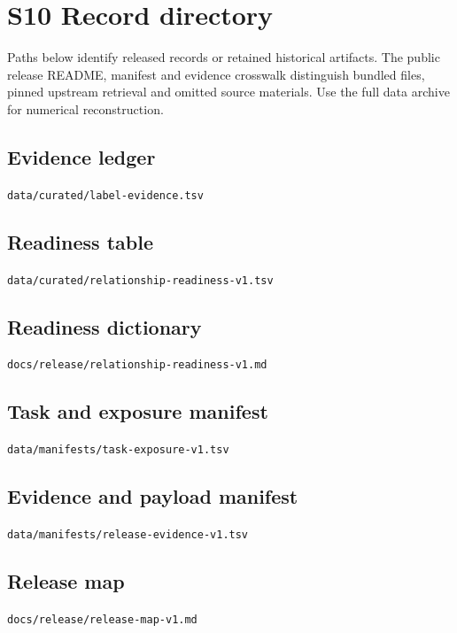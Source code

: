 \documentclass[
  10pt,
  a4paper,
]{article}
\begin{document}
\section{S10 Record directory}\label{s10-record-directory}

Paths below identify released records or retained historical artifacts. The public release README, manifest and evidence crosswalk distinguish bundled files, pinned upstream retrieval and omitted source materials. Use the full data archive for numerical reconstruction.

\subsection{Evidence ledger}\label{evidence-ledger}

\nolinkurl{data/curated/label-evidence.tsv}

\subsection{Readiness table}\label{readiness-table}

\nolinkurl{data/curated/relationship-readiness-v1.tsv}

\subsection{Readiness dictionary}\label{readiness-dictionary}

\nolinkurl{docs/release/relationship-readiness-v1.md}

\subsection{Task and exposure manifest}\label{task-and-exposure-manifest}

\nolinkurl{data/manifests/task-exposure-v1.tsv}

\subsection{Evidence and payload manifest}\label{evidence-and-payload-manifest}

\nolinkurl{data/manifests/release-evidence-v1.tsv}

\subsection{Release map}\label{release-map}

\nolinkurl{docs/release/release-map-v1.md}
\end{document}
